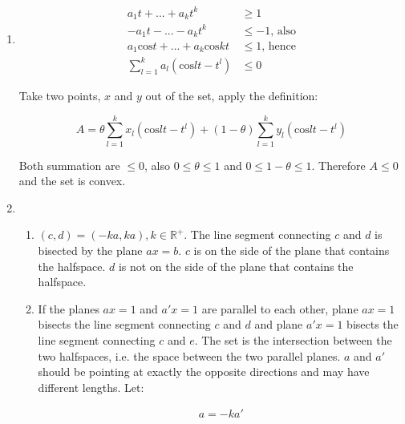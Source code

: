 \documentclass[11pt, letterpaper, titlepage]{article}
\begin{document}
\begin{enumerate}
    \item 
    
    \begin{equation*}
        \begin{aligned}
            a_{1}t + ... + a_{k}t^{k} &\geq 1 \\
            -a_{1}t - ... - a_{k}t^{k} &\leq -1 \text{, also} \\
            a_{1}\text{cos} t + ... + a_{k} \text{cos} kt &\leq 1 \text{, hence} \\
            \sum_{l=1}^{k} a_{l}(\text{cos} lt - t^{l}) &\leq 0
        \end{aligned}
    \end{equation*}
    
    Take two points, $ x $ and $ y $ out of the set, apply the definition:
    
    \begin{equation*}
        A = \theta \sum_{l=1}^{k} x_{l}(\text{cos} lt - t^{l}) + (1-\theta) \sum_{l=1}^{k} y_{l}(\text{cos} lt - t^{l})
    \end{equation*}
    
    Both summation are $ \leq 0 $, also $ 0 \leq \theta \leq 1 $ and $ 0 \leq 1 - \theta \leq 1 $. Therefore $ A \leq 0 $ and the set is convex.
    
    \item
    
    \begin{enumerate}
        \item $ (c, d) = (-ka, ka), k\in \mathbb{R}^{+}$. The line segment connecting $ c $ and $ d $ is bisected by the plane $ a x = b $. $ c $ is on the side of the plane that contains the halfspace. $ d $ is not on the side of the plane that contains the halfspace.
        
        \item If the planes $ a x = 1 $ and $ a' x = 1 $ are parallel to each other, plane $ a x = 1 $ bisects the line segment connecting $ c $ and $ d $ and plane $ a' x = 1 $ bisects the line segment connecting $ c $ and $ e $. The set is the intersection between the two halfspaces, i.e. the space between the two parallel planes. $ a $ and $ a' $ should be pointing at exactly the opposite directions and may have different lengths. Let:
        
        \begin{equation*}
            \begin{aligned}
                a = - k a'
            \end{aligned}
        \end{equation*}
        

\end{enumerate}
\end{enumerate}
\end{document}
